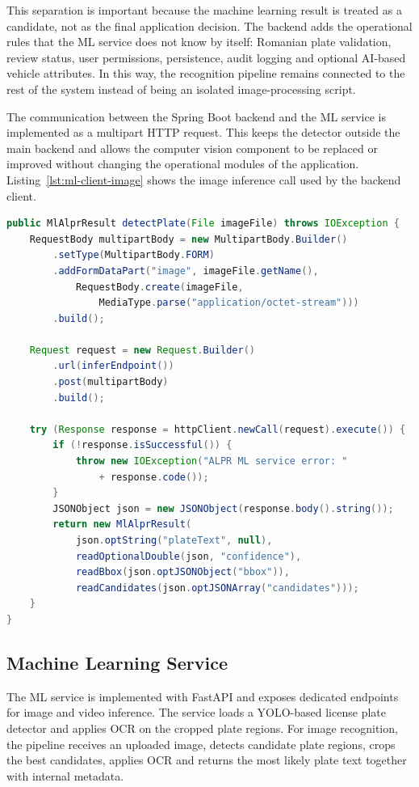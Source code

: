 ﻿\documentclass[12pt,a4paper]{article}
\begin{document}
This separation is important because the machine learning result is treated as a candidate, not as the final application decision. The backend adds the operational rules that the ML service does not know by itself: Romanian plate validation, review status, user permissions, persistence, audit logging and optional AI-based vehicle attributes. In this way, the recognition pipeline remains connected to the rest of the system instead of being an isolated image-processing script.

The communication between the Spring Boot backend and the ML service is implemented as a multipart HTTP request. This keeps the detector outside the main backend and allows the computer vision component to be replaced or improved without changing the operational modules of the application. Listing~\ref{lst:ml-client-image} shows the image inference call used by the backend client.

\begin{lstlisting}[language=Java, caption={Backend call to the ALPR machine learning service}, label={lst:ml-client-image}]
public MlAlprResult detectPlate(File imageFile) throws IOException {
    RequestBody multipartBody = new MultipartBody.Builder()
        .setType(MultipartBody.FORM)
        .addFormDataPart("image", imageFile.getName(),
            RequestBody.create(imageFile,
                MediaType.parse("application/octet-stream")))
        .build();

    Request request = new Request.Builder()
        .url(inferEndpoint())
        .post(multipartBody)
        .build();

    try (Response response = httpClient.newCall(request).execute()) {
        if (!response.isSuccessful()) {
            throw new IOException("ALPR ML service error: "
                + response.code());
        }
        JSONObject json = new JSONObject(response.body().string());
        return new MlAlprResult(
            json.optString("plateText", null),
            readOptionalDouble(json, "confidence"),
            readBbox(json.optJSONObject("bbox")),
            readCandidates(json.optJSONArray("candidates")));
    }
}
\end{lstlisting}

\subsection{Machine Learning Service}

The ML service is implemented with FastAPI and exposes dedicated endpoints for image and video inference. The service loads a YOLO-based license plate detector and applies OCR on the cropped plate regions. For image recognition, the pipeline receives an uploaded image, detects candidate plate regions, crops the best candidates, applies OCR and returns the most likely plate text together with internal metadata.
\end{document}
